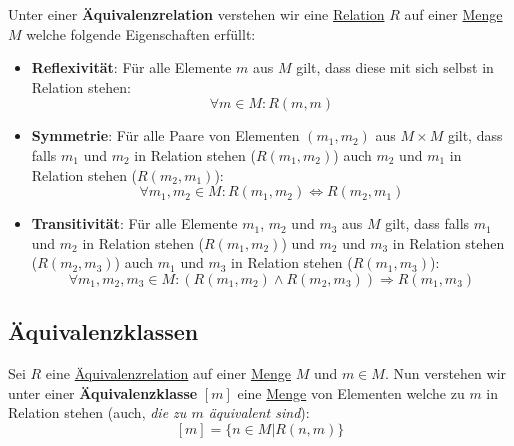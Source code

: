 \documentclass[../../main.tex]{subfiles}
\begin{document}
	\begin{definition}[Äquivalenzrelation]
		\label{def:Äquivalenzrelation}
		Unter einer \textbf{Äquivalenzrelation} verstehen wir eine \hyperref[def:Relation]{Relation} $R$ auf einer \hyperref[def:Menge]{Menge} $M$ welche folgende Eigenschaften erfüllt: 
		\begin{itemize}
			\item \textbf{Reflexivität}: Für alle Elemente $m$ aus $M$ gilt, dass diese mit sich selbst in Relation stehen: $$\forall m \in M: R(m,m)$$
			\item \textbf{Symmetrie}: Für alle Paare von Elementen $(m_1, m_2)$ aus $M \times M$ gilt, dass falls $m_1$ und $m_2$ in Relation stehen ($R(m_1,m_2)$) auch $m_2$ und $m_1$ in Relation stehen ($R(m_2, m_1)$): $$\forall m_1, m_2 \in M: R(m_1,m_2) \Leftrightarrow R(m_2, m_1)$$
			\item \textbf{Transitivität}: Für alle Elemente $m_1$, $m_2$ und $m_3$ aus $M$ gilt, dass falls $m_1$ und $m_2$ in Relation stehen ($R(m_1, m_2)$) und $m_2$ und $m_3$ in Relation stehen ($R(m_2,m_3)$) auch $m_1$ und $m_3$ in Relation stehen ($R(m_1, m_3)$): $$\forall m_1, m_2, m_3 \in M: (R(m_1,m_2) \land R(m_2,m_3)  ) \Rightarrow R(m_1,m_3) $$
		\end{itemize}
	\end{definition}

	\subsection{Äquivalenzklassen}
	
	\begin{definition}[Äquivalenzklasse]
		\label{def:Äquivalenzklasse}
		Sei $R$ eine \hyperref[def:Äquivalenzrelation]{Äquivalenzrelation} auf einer \hyperref[def:Menge]{Menge} $M$ und $m \in M$. Nun verstehen wir unter einer \textbf{Äquivalenzklasse} $[m]$ eine \hyperref[def:Menge]{Menge} von Elementen welche zu $m$ in Relation stehen (auch, \textit{die zu $m$ äquivalent sind}): $$[m]=\{n \in M | R(n,m)\}$$
	\end{definition}

\end{document}
